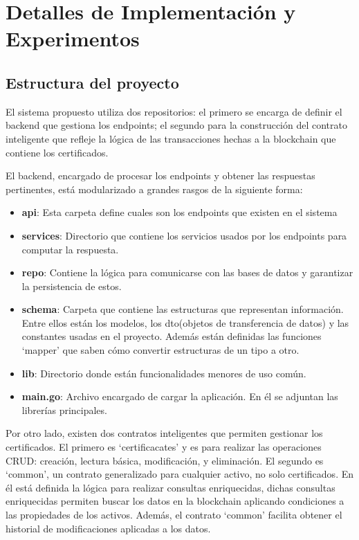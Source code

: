 \chapter{Detalles de Implementación y Experimentos}\label{chapter:implementation}


\section{Estructura del proyecto}

El sistema propuesto utiliza dos repositorios: el primero se encarga de definir el backend que gestiona los endpoints; el segundo para la construcción del contrato inteligente que refleje la lógica de las transacciones hechas a la blockchain que contiene los certificados.

El backend, encargado de procesar los endpoints y obtener las respuestas pertinentes, está modularizado a grandes rasgos de la siguiente forma:
\begin{itemize}
	\item \textbf{api}: Esta carpeta define cuales son los endpoints que existen en el sistema
	\item \textbf{services}: Directorio que contiene los servicios usados por los endpoints para computar la respuesta.
	\item \textbf{repo}: Contiene la lógica para comunicarse con las bases de datos y garantizar la persistencia de estos.
	\item \textbf{schema}: Carpeta que contiene las estructuras que representan información. Entre ellos están los modelos, los dto(objetos de transferencia de datos) y las constantes usadas en el proyecto. Además están definidas las funciones `mapper' que saben cómo convertir estructuras de un tipo a otro.
	\item \textbf{lib}: Directorio donde están funcionalidades menores de uso común.
	\item \textbf{main.go}: Archivo encargado de cargar la aplicación. En él se adjuntan las librerías principales.
\end{itemize}

Por otro lado, existen dos contratos inteligentes que permiten gestionar los certificados. El primero es `certificacates' y es para realizar las operaciones CRUD: creación, lectura básica, modificación, y eliminación. El segundo es `common', un contrato generalizado para cualquier activo, no solo certificados. En él está definida la lógica para realizar consultas enriquecidas, dichas consultas enriquecidas permiten buscar los datos en la blockchain aplicando condiciones a las propiedades de los activos. Además, el contrato `common' facilita obtener el historial de modificaciones aplicadas a los datos.


